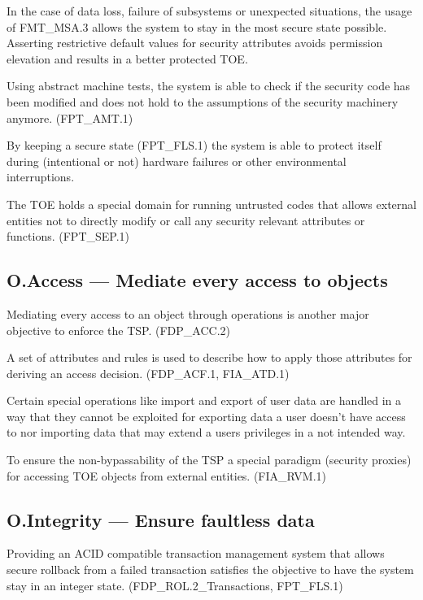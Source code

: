 \documentclass[12pt,english]{scrbook}
\begin{document}
    In the case of data loss, failure of subsystems or unexpected situations,
    the usage of FMT\_MSA.3 allows the system to stay in the most secure state
    possible. Asserting restrictive default values for security attributes
    avoids permission elevation and results in a better protected TOE.
    
    Using abstract machine tests, the system is able to check if the security
    code has been modified and does not hold to the assumptions of the security
    machinery anymore. (FPT\_AMT.1)

    By keeping a secure state (FPT\_FLS.1) the system is able to protect itself
    during (intentional or not) hardware failures or other environmental
    interruptions.
    
    The TOE holds a special domain for running untrusted codes that allows
    external entities not to directly modify or call any security relevant
    attributes or functions. (FPT\_SEP.1)

\subsection{O.Access --- Mediate every access to objects}

    Mediating every access to an object through operations is another major
    objective to enforce the TSP. (FDP\_ACC.2)

    A set of attributes and rules is used to describe how to apply those
    attributes for deriving an access decision. (FDP\_ACF.1, FIA\_ATD.1)  

    Certain special operations like import and export of user data are handled
    in a way that they cannot be exploited for exporting data a user doesn't
    have access to nor importing data that may extend a users privileges in a
    not intended way. 

    To ensure the non-bypassability of the TSP a special paradigm (security
    proxies) for accessing TOE objects from external entities. (FIA\_RVM.1)
    
\subsection{O.Integrity --- Ensure faultless data}

    Providing an ACID compatible transaction management system that allows
    secure rollback from a failed transaction satisfies the objective to have
    the system stay in an integer state. (FDP\_ROL.2\_Transactions, FPT\_FLS.1)
\end{document}
